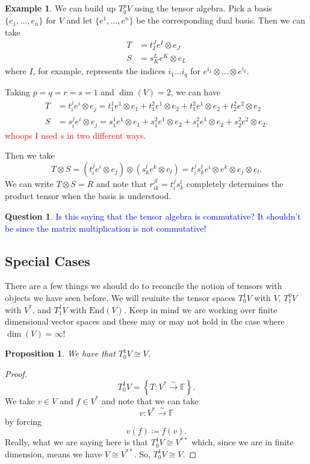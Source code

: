 \documentclass[12pt]{article}
\newcommand{\field}{\mathbb{F}}
\newcommand{\linmap}{\overset{\sim}{\longrightarrow}}
\newcommand{\End}{\mathrm{End}}
\newcommand{\tspace}{T_q^pV}
\newtheorem{proposition}{Proposition}[section]
\theoremstyle{definition}
\newtheorem{example}{Example}[section]
\newtheorem{question}{Question}[section]
\begin{document}
\begin{example}
We can build up $\tspace$ using the tensor algebra.  Pick a basis $\{e_1,\dots,e_n\}$ for $V$ and let $\{e^1,\dots,e^n\}$ be the corresponding dual basis.  Then we can take
\begin{align*}
    T &= t_I^J e^I\otimes e_J\\
    S &= s_K^L e^K \otimes e_L
\end{align*}
where $I$, for example, represents the indices $i_1\dots i_q$ for $e^{i_1} \otimes \dots \otimes e^{i_q}$. 

Taking $p=q=r=s=1$ and $\dim(V)=2$, we can have
\begin{align}
    T &= t_i^j e^i \otimes e_j = t_1^1 e^1 \otimes e_1 + t_1^2 e^1 \otimes e_2 + t^2_1 e^1 \otimes e_2 + t_2^2 e^2 \otimes e_2\\ 
    S &= s_i^j e^i \otimes e_j = s_1^1 e^1 \otimes e_1 + s_1^2 e^1 \otimes e_2 + s^2_1 e^1 \otimes e_2 + s_2^2 e^2 \otimes e_2.
\end{align}
\textcolor{red}{whoops I used $s$ in two different ways.}

Then we take
\[
T\otimes S = (t_i^j e^i \otimes e_j)\otimes (s_k^l e^k \otimes e_l) = t_i^js_k^l e^i\otimes e^k \otimes e_j\otimes e_l. 
\]
We can write $T\otimes S = R$ and note that $r_{ik}^{jl}=t_i^js_k^l$ completely determines the product tensor when the basis is understood.  
\end{example}

\begin{question}
\textcolor{blue}{Is this saying that the tensor algebra is commutative? It shouldn't be since the matrix multiplication is not commutative!}
\end{question}

\subsection{Special Cases}
There are a few things we should do to reconcile the notion of tensors with objects we have seen before.  We will reuinite the tensor spaces $T_0^1V$ with $V$, $T_1^0V$ with $V^*$, and $T_1^1V$ with $\End(V)$. Keep in mind we are working over finite dimensional vector spaces and these may or may not hold in the case where $\dim(V)=\infty$!

\begin{proposition} 
We have that $T_0^1V\cong V$.
\end{proposition}
\begin{proof}
\[
T_0^1V = \left\{T\colon V^* \linmap \field\right\}.
\]
We take $v\in V$ and $f\in V^*$ and note that we can take
\[
v\colon V^* \linmap \field
\]
by forcing
\[
v(f)\coloneqq f(v).
\]
Really, what we are saying here is that $T_0^1V\cong V^{**}$ which, since we are in finite dimension, means we have $V\cong V^{**}$. So, $T_0^1V\cong V$.
\end{proof}
\end{document}
